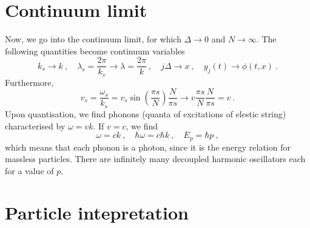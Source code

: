 \section{Continuum limit}

    Now, we go into the continuum limit, for which $\Delta \rightarrow 0$ and $N \rightarrow \infty$. The following quantities become continuum variables 
    \begin{equation*}
        k_s \rightarrow k ~, \quad \lambda_s = \frac{2\pi}{k_s} \rightarrow \lambda = \frac{2\pi}{k}~, \quad j \Delta \rightarrow x ~, \quad y_j(t) \rightarrow \phi(t, x) ~.
    \end{equation*}
    Furthermore, 
    \begin{equation*}
        v_s = \frac{\omega_s}{k_s} = v_s \sin(\frac{\pi s}{N}) \frac{N}{\pi s} \rightarrow v \frac{\pi s}{N} \frac{N}{\pi s} = v ~.
    \end{equation*}
    Upon quantisation, we find phonons (quanta of excitations of elestic string) characterised by $\omega = v k$. If $v = c$, we find 
    \begin{equation*}
        \omega = c k ~, \quad \hbar \omega = c \hbar k ~, \quad E_p = \hbar p ~,
    \end{equation*}
    which means that each phonon is a photon, since it is the energy relation for massless particles. There are infinitely many decoupled harmonic oscillators each for a value of $p$.

\section{Particle intepretation}

